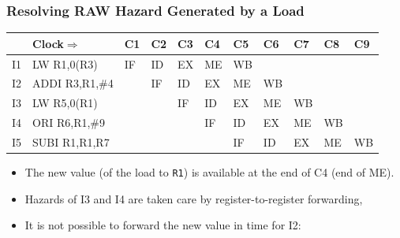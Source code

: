 \documentclass{beamer}
\renewcommand{\emph}[1]{\textcolor{structure}{#1}}
\newcommand{\emp}[1]{\textcolor{DikuRed}{ #1}}
\begin{document}
\begin{frame}[fragile,t]
\frametitle{Resolving RAW Hazard Generated by a Load}

\bigskip

\begin{scriptsize}
\begin{tabular}{lllllllllll}
\hline
   & Clock$\Rightarrow$ & C1 & C2 & C3 & C4 & C5 & C6 & C7 & C8 & C9 \\\hline
I1 & LW   R1,0(R3)      & IF & ID & EX & ME & \emp{WB}&    &    &    &    \\
I2 & ADDI R3,R1,\#4     &    & IF & ID & \alert{EX} & ME & WB &    &    &    \\
I3 & LW   R5,0(R1)      &    &    & IF & ID & \emph{EX} & ME & WB &    &    \\
I4 & ORI  R6,R1,\#9     &    &    &    & IF & \emph{ID} & EX & ME & WB &    \\
I5 & SUBI R1,R1,R7      &    &    &    &    & IF & ID & EX & ME & WB \\\hline
\end{tabular}
\end{scriptsize} 


\begin{scriptsize}
\begin{itemize}

\item The new value (of the load to {\tt R1}) is available at the end of C4 (end of ME).
\item Hazards of I3 and I4 are taken care by register-to-register forwarding,
\item \alert{It is not possible to forward the new value in time for I2}:
\begin{itemize}
\end{itemize}
\end{itemize}
\end{scriptsize}


\end{frame}
\end{document}
